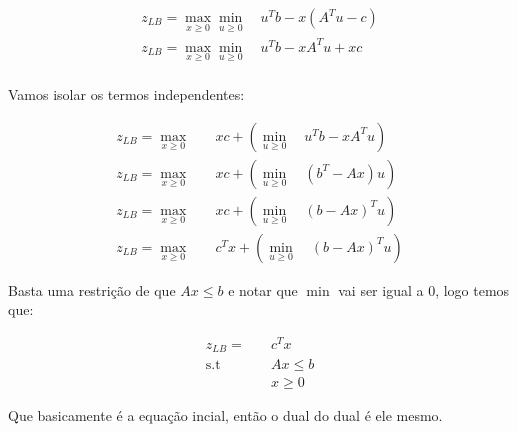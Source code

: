 \documentclass[]{article}
\numberwithin{equation}{section}
\begin{document}
\begin{align}
z_{LB} = \max_{x \geq 0} \min_{u \geq 0} \quad u^Tb - x(A^Tu - c)       \\
z_{LB} = \max_{x \geq 0} \min_{u \geq 0} \quad u^Tb - xA^Tu + xc       \\
\end{align}

Vamos isolar os termos independentes:

\begin{align}
z_{LB} =  \max_{x \geq 0} &\quad  xc +
          \left( \min_{u \geq 0} \quad u^Tb - xA^Tu \right)  \\
z_{LB} =  \max_{x \geq 0} &\quad  xc +
          \left( \min_{u \geq 0} \quad (b^T - Ax)u \right)  \\
z_{LB} =  \max_{x \geq 0} &\quad  xc +
          \left( \min_{u \geq 0} \quad (b - Ax)^Tu \right) \\
z_{LB} =  \max_{x \geq 0} &\quad  c^Tx +
          \left( \min_{u \geq 0} \quad (b - Ax)^Tu \right) 
\end{align}

Basta uma restrição de que $Ax \leq b$ e notar que $\min$ vai ser igual a 0, logo temos que:

\begin{align}
z_{LB} =    &\quad  c^Tx       \\
\text{s.t}  &\quad  Ax \leq b  \\
            &\quad  x \geq 0
\end{align}

Que basicamente é a equação incial, então o dual do dual é ele mesmo.
\end{document}
